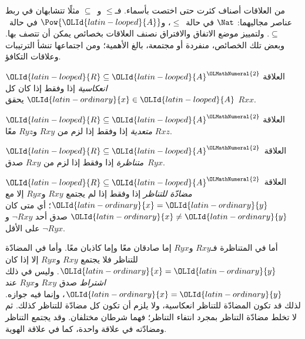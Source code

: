 \documentclass[../../../include/open-logic-section]{subfiles}
\begin{document}

\begin{intro}
من العلاقات أصناف كثرت حتى اختصت بأسماء. فـ$\le$ و~$\subseteq$
مثلًا تتشابهان في ربط عناصر مجاليهما: $\Nat$ في حالة~$\le$،
و$\Pow{{\OLId{latin-looped}{A}}}$ في حالة~$\subseteq$. ولتمييز موضع الاتفاق والافتراق
نصنف العلاقات بخصائص يمكن أن تتصف بها. وبعض تلك الخصائص، منفردة
أو مجتمعة، بالغ الأهمية؛ ومن اجتماعها تنشأ الترتيبات وعلاقات التكافؤ.
\end{intro}

\begin{defn}[الانعكاسية]
العلاقة ${\OLId{latin-looped}{R}} \subseteq {\OLId{latin-looped}{A}}^{\OLMathNumeral{2}}$ \emph{انعكاسية} إذا وفقط إذا كان كل ${\OLId{latin-ordinary}{x}} \in
{\OLId{latin-looped}{A}}$ يحقق $Rxx$.
\end{defn}

\begin{defn}[التعدية]
العلاقة ${\OLId{latin-looped}{R}} \subseteq {\OLId{latin-looped}{A}}^{\OLMathNumeral{2}}$ \emph{متعدية} إذا وفقط إذا لزم من $Rxy$
و$Ryz$ معًا $Rxz$.
\end{defn}

\begin{defn}[التناظر]
العلاقة~${\OLId{latin-looped}{R}} \subseteq {\OLId{latin-looped}{A}}^{\OLMathNumeral{2}}$ \emph{متناظرة} إذا وفقط إذا لزم من
$Rxy$ صدق~$Ryx$.
\end{defn}

\begin{defn}
العلاقة~${\OLId{latin-looped}{R}} \subseteq {\OLId{latin-looped}{A}}^{\OLMathNumeral{2}}$ \emph{مضادّة\- للتناظر\-} إذا وفقط إذا لم
يجتمع $Rxy$ و$Ryx$ إلا مع ${\OLId{latin-ordinary}{x}}={\OLId{latin-ordinary}{y}}$؛ أي متى كان ${\OLId{latin-ordinary}{x}}\neq {\OLId{latin-ordinary}{y}}$ صدق أحد
$\lnot Rxy$ و$\lnot Ryx$ على الأقل.
\end{defn}

\begin{explain}
أما في المتناظرة فـ$Rxy$ و$Ryx$ إما صادقان معًا وإما كاذبان معًا.
وأما في المضادّة للتناظر فلا يجتمع $Rxy$ و$Ryx$ إلا إذا كان
${\OLId{latin-ordinary}{x}} = {\OLId{latin-ordinary}{y}}$. وليس في ذلك \emph{اشتراط} صدق $Rxy$ و$Ryx$ عند ${\OLId{latin-ordinary}{x}} = {\OLId{latin-ordinary}{y}}$،
وإنما فيه جوازه. لذلك قد تكون المضادّة للتناظر انعكاسية، ولا يلزم
أن تكون كل مضادّة للتناظر كذلك. ثم لا تخلط مضادّة التناظر بمجرد
انتفاء التناظر؛ فهما شرطان مختلفان. وقد يجتمع التناظر ومضادّته
في علاقة واحدة، كما في علاقة الهوية.
\end{explain}
\end{document}
